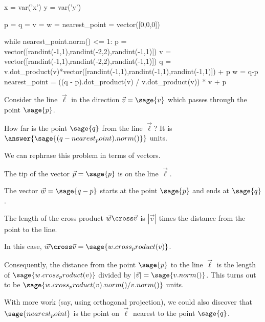 \documentclass{ximera}
\author{Jim Fowler}
\begin{document}
\makerandom

\begin{sagesilent}
  x = var('x')
  y = var('y')

  p = q = v = w = nearest_point = vector([0,0,0])

  while nearest_point.norm() <= 1:
    p = vector([randint(-1,1),randint(-2,2),randint(-1,1)])
    v = vector([randint(-1,1),randint(-2,2),randint(-1,1)])
    q = v.dot_product(v)*vector([randint(-1,1),randint(-1,1),randint(-1,1)]) + p
    w = q-p
    nearest_point = ((q - p).dot_product(v) / v.dot_product(v)) * v + p
\end{sagesilent}

\begin{exercise}
  Consider the line $\vec{\ell}$ in the direction $\vec{v} = \sage{v}$ which passes through the point $\sage{p}$.
  
  How far is the point \(\sage{q}\) from the line \(\vec{\ell}\)?  It is
  \(\answer{\sage{(q - nearest_point).norm()}}\) units.

  \begin{hint}
    We can rephrase this problem in terms of vectors.
  \end{hint}

  \begin{hint}
    The tip of the vector $\vec{p} = \sage{p}$ is on the line $\vec{\ell}$.
  \end{hint}

  \begin{hint}
    The vector $\vec{w} = \sage{q-p}$ starts at the point $\sage{p}$ and ends at $\sage{q}$.
  \end{hint}

  \begin{hint}
    The length of the cross product $\vec{w} \cross \vec{v}$ is $|\vec{v}|$ times the distance from the point to the line.
  \end{hint}

  \begin{hint}
    In this case, $\vec{w} \cross \vec{v} = \sage{w.cross_product(v)}$.
  \end{hint}

  \begin{hint}
    Consequently, the distance from the point $\sage{p}$ to the line $\vec{\ell}$ is the length of $\sage{w.cross_product(v)}$ divided by $|\vec{v}| = \sage{v.norm()}$.  This turns out to be $\sage{w.cross_product(v).norm()/v.norm()}$ units.
  \end{hint}

  \begin{hint}
    With more work (say, using orthogonal projection), we could also discover that $\sage{nearest_point}$ is the point on $\vec{\ell}$ nearest to the point $\sage{q}$.
  \end{hint}
  
\end{exercise}
\end{document}
